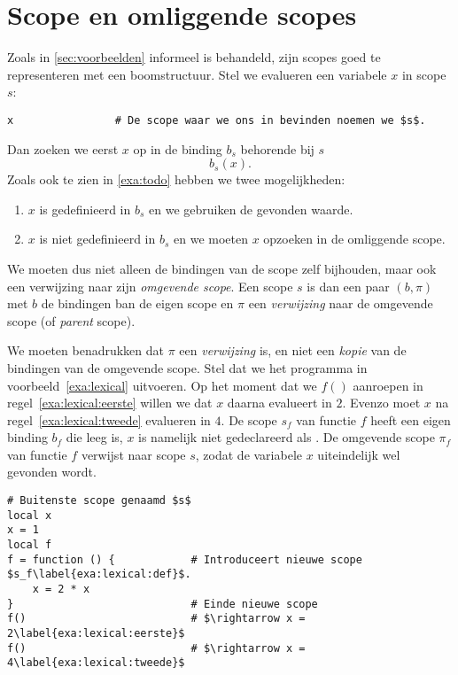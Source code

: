 \section{Scope en omliggende scopes}

Zoals in \ref{sec:voorbeelden} informeel is behandeld, zijn scopes goed te representeren met een boomstructuur. Stel we evalueren een variabele $x$ in scope $s$:

\begin{lstlisting}
x                # De scope waar we ons in bevinden noemen we $s$.
\end{lstlisting}

Dan zoeken we eerst $x$ op in de binding $b_s$ behorende bij $s$
\begin{equation}
  b_s(x).
\end{equation}
Zoals ook te zien in \ref{exa:todo} hebben we twee mogelijkheden:
\begin{enumerate}
  \item $x$ is gedefinieerd in $b_s$ en we gebruiken de gevonden waarde.
  \item $x$ is niet gedefinieerd in $b_s$ en we moeten $x$ opzoeken in de omliggende scope.
\end{enumerate}
We moeten dus niet alleen de bindingen van de scope zelf bijhouden, maar ook een verwijzing naar zijn \emph{omgevende scope}. Een scope $s$ is dan een paar $(b,\pi)$ met $b$ de bindingen ban de eigen scope en $\pi$ een \emph{verwijzing} naar de omgevende scope (of \emph{parent} scope).

We moeten benadrukken dat $\pi$ een \emph{verwijzing} is, en niet een \emph{kopie} van de bindingen van de omgevende scope. Stel dat we het programma in voorbeeld~\ref{exa:lexical} uitvoeren. Op het moment dat we $f()$ aanroepen in regel~\ref{exa:lexical:eerste} willen we dat $x$ daarna evalueert in $2$. Evenzo moet $x$ na regel~\ref{exa:lexical:tweede} evalueren in $4$. De scope $s_f$ van functie $f$ heeft een eigen binding $b_f$ die leeg is, $x$ is namelijk niet gedeclareerd als \LOCAL. De omgevende scope $\pi_f$ van functie $f$ verwijst naar scope $s$, zodat de variabele $x$ uiteindelijk wel gevonden wordt.

\begin{lstlisting}[caption=Lexicale scope,label=exa:lexical]
# Buitenste scope genaamd $s$
local x
x = 1
local f
f = function () {            # Introduceert nieuwe scope $s_f\label{exa:lexical:def}$.
    x = 2 * x
}                            # Einde nieuwe scope
f()                          # $\rightarrow x = 2\label{exa:lexical:eerste}$
f()                          # $\rightarrow x = 4\label{exa:lexical:tweede}$
\end{lstlisting}

